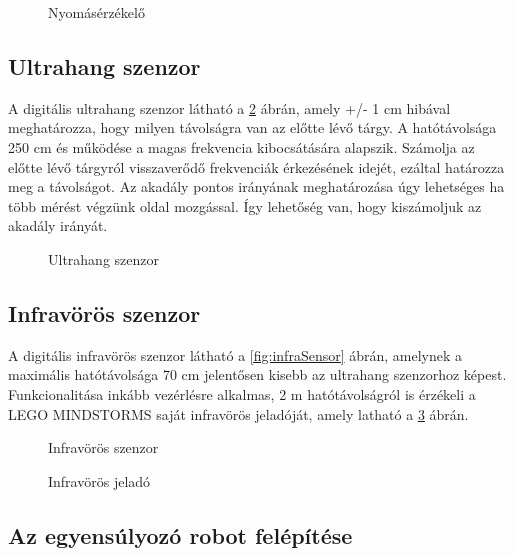 \begin{figure}[!htb]
	\centering
	\caption{Nyomásérzékelő}
	\label{fig:touchSensor}
\end{figure}

\subsection{Ultrahang szenzor}
A digitális ultrahang szenzor látható a \ref{fig:ultrasonicSensor} ábrán, amely +/- 1 cm hibával meghatározza, hogy milyen távolságra van az előtte lévő tárgy. A hatótávolsága 250 cm és működése a magas frekvencia kibocsátására  alapszik. Számolja az előtte lévő tárgyról visszaverődő frekvenciák érkezésének idejét, ezáltal határozza meg a távolságot. Az akadály pontos irányának meghatározása úgy lehetséges ha több mérést végzünk oldal mozgással. Így lehetőség van, hogy kiszámoljuk az akadály irányát.

\begin{figure}[!htb]
	\centering
	\caption{Ultrahang szenzor}
	\label{fig:ultrasonicSensor}
\end{figure}

\subsection{Infravörös szenzor}
A digitális infravörös szenzor látható a \ref{fig:infraSensor} ábrán, amelynek a maximális hatótávolsága 70 cm jelentősen kisebb az ultrahang szenzorhoz képest. Funkcionalitása inkább vezérlésre alkalmas, 2 m hatótávolságról is érzékeli a LEGO MINDSTORMS saját infravörös jeladóját, amely latható a \ref{fig:beacon} ábrán.

\begin{figure}[!htb]
	\centering
	\caption{Infravörös szenzor}
	\label{fig:infraSensor}
	\endminipage
	\caption{Infravörös jeladó}
	\label{fig:beacon}
	\endminipage
\end{figure}

\subsection{Az egyensúlyozó robot felépítése}{\label{egyensulySubSec}}

